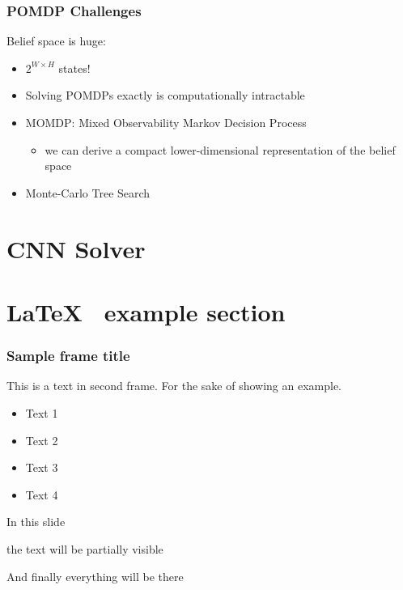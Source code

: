 \documentclass[aspectratio=169]{beamer}
\begin{document}
\begin{frame}
	\frametitle{POMDP Challenges}
	Belief space is huge: 
	\begin{itemize}
		\item $2^{W \times H}$ states!
		\item Solving POMDPs exactly is computationally intractable
		\item MOMDP: Mixed Observability Markov Decision Process
		\begin{itemize}
			\item we can derive a compact lower-dimensional representation of the belief space
		\end{itemize}
		\item Monte-Carlo Tree Search
	\end{itemize}
\end{frame}



\section{CNN Solver}






\section{\LaTeX ~ example section}

\begin{frame}
\frametitle{Sample frame title}
This is a text in second frame. For the sake of showing an example.

\begin{itemize}
    \item Text 1
    \item Text 2
    \item Text 3
    \item Text 4
\end{itemize}
\end{frame}


\begin{frame}
In this slide \pause

the text will be partially visible \pause

And finally everything will be there
\end{frame}
\end{document}
